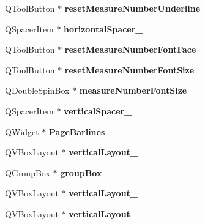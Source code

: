 \begin{DoxyCompactItemize}
Q\+Tool\+Button $\ast$ {\bfseries reset\+Measure\+Number\+Underline}
\item 
\mbox{\label{class_ui___edit_style_base_a8d55f4f03a218f9db0eb8f9639e9bdd6}} 
Q\+Spacer\+Item $\ast$ {\bfseries horizontal\+Spacer\+\_}
\item 
\mbox{\label{class_ui___edit_style_base_a3c7841181659d2dd7723b12dec05a9ed}} 
Q\+Tool\+Button $\ast$ {\bfseries reset\+Measure\+Number\+Font\+Face}
\item 
\mbox{\label{class_ui___edit_style_base_a7eddb7fc2dae91d10785e4a90c74d88f}} 
Q\+Tool\+Button $\ast$ {\bfseries reset\+Measure\+Number\+Font\+Size}
\item 
\mbox{\label{class_ui___edit_style_base_a723b74f7427a73db9bce0c101bc3de97}} 
Q\+Double\+Spin\+Box $\ast$ {\bfseries measure\+Number\+Font\+Size}
\item 
\mbox{\label{class_ui___edit_style_base_a33b108bcd7b510f96a7d68a0f9a24337}} 
Q\+Spacer\+Item $\ast$ {\bfseries vertical\+Spacer\+\_}
\item 
\mbox{\label{class_ui___edit_style_base_aeae102763469eec77a8a6fee0f21495e}} 
Q\+Widget $\ast$ {\bfseries Page\+Barlines}
\item 
\mbox{\label{class_ui___edit_style_base_a0415371d0416170221722f73fbcfbbf8}} 
Q\+V\+Box\+Layout $\ast$ {\bfseries vertical\+Layout\+\_}
\item 
\mbox{\label{class_ui___edit_style_base_a1ce357aa43ca29973e430748ae38920a}} 
Q\+Group\+Box $\ast$ {\bfseries group\+Box\+\_}
\item 
\mbox{\label{class_ui___edit_style_base_aefc7401fc1cc2057c0f7b5d1d84a2949}} 
Q\+V\+Box\+Layout $\ast$ {\bfseries vertical\+Layout\+\_}
\item 
\mbox{\label{class_ui___edit_style_base_a22b33926406fd95f8d74aeb4bb7b5d2f}} 
Q\+V\+Box\+Layout $\ast$ {\bfseries vertical\+Layout\+\_}

\end{DoxyCompactItemize}
